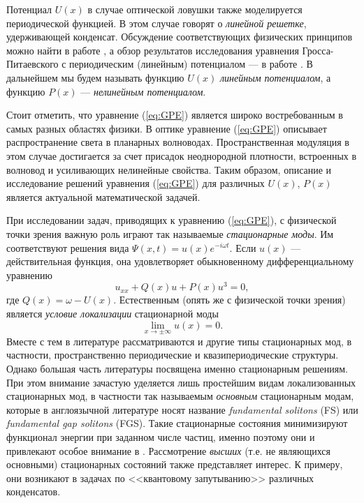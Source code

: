 Потенциал $U(x)$ в случае оптической ловушки также моделируется периодической функцией.
В этом случае говорят о {\it линейной решетке}, удерживающей конденсат.
Обсуждение соответствующих физических принципов можно найти в работе \cite{Pitaevskii}, а обзор результатов исследования уравнения Гросса-Питаевского с периодическим (линейным) потенциалом --- в работе \citep{Brazhnyi}.
В дальнейшем мы будем называть функцию $U(x)$ {\it линейным потенциалом}, а функцию $P(x)$ --- {\it нелинейным потенциалом}.

Стоит отметить, что уравнение (\ref{eq:GPE}) является широко востребованным в самых разных областях физики.
В оптике уравнение (\ref{eq:GPE}) описывает распространение света в планарных волноводах.
Пространственная модуляция в этом случае достигается за счет присадок неоднородной плотности, встроенных в волновод и усиливающих нелинейные свойства.
Таким образом, описание и исследование решений уравнения (\ref{eq:GPE}) для различных $U(x)$, $P(x)$ является актуальной математической задачей.

При исследовании задач, приводящих к уравнению (\ref{eq:GPE}), с физической точки зрения важную роль играют так называемые {\it стационарные моды}.
Им соответствуют решения вида $\Psi(x, t) = u(x) e^{-i \omega t}$.
Если $u(x)$ --- действительная функция, она удовлетворяет обыкновенному дифференциальному уравнению
%
\begin{equation}
u_{xx} + Q(x)u + P(x)u^3 = 0,
\label{eq:stationary}
\end{equation}
%
где $Q(x) = \omega - U(x)$.
Естественным (опять же с физической точки зрения) является {\it условие локализации} стационарной моды
%
\begin{equation}
\lim \limits_{x \to \pm \infty} u(x) = 0.
\label{eq:localization}
\end{equation}
%
Вместе с тем в литературе рассматриваются и другие типы стационарных мод, в частности, пространственно периодические и квазипериодические структуры.
Однако большая часть литературы посвящена именно стационарным решениям.
При этом внимание зачастую уделяется лишь простейшим видам локализованных стационарных мод, в частности так называемым {\it основным} стационарным модам, которые в англоязычной литературе носят название {\it fundamental solitons} (FS) или {\it fundamental gap solitons} (FGS).
Такие стационарные состояния минимизируют функционал энергии при заданном числе частиц, именно поэтому они и привлекают особое внимание в \cite{Kartashov}.
Рассмотрение {\it высших} (т.е. не являющихся основными) стационарных состояний также представляет интерес.
К примеру, они возникают в задачах по <<квантовому запутыванию>> различных конденсатов.

